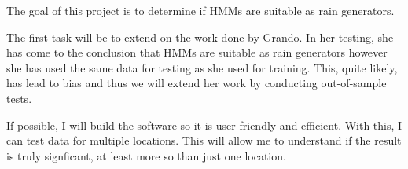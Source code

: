 The goal of this project is to determine if HMMs are suitable as rain generators.

The first task will be to extend on the work done by Grando. In her testing, she has come to the conclusion that HMMs are suitable as rain generators however she has used the same data for testing as she used for training. This, quite likely, has lead to bias and thus we will extend her work by conducting out-of-sample tests. 

If possible, I will build the software so it is user friendly and efficient. With this, I can test data for multiple locations. This will allow me to understand if the result is truly signficant, at least more so than just one location.